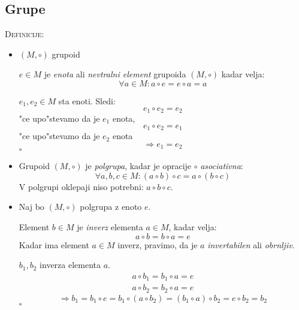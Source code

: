 \subsection{Grupe}

\textsc{Definicije:}
\begin{itemize}
	\item $(M, \circ)$ grupoid
	
	$e \in M$ je \emph{enota} ali \emph{nevtralni element} grupoida $(M, \circ)$ kadar velja:
	\begin{equation*}
	\forall a \in M: a \circ e = e \circ a = a
	\end{equation*}
	
	
	$e_1, e_2 \in M$ sta enoti. Sledi:
	\begin{equation*}
	e_1 \circ e_2 = e_2
	\end{equation*}
	"ce upo"stevamo da je $e_1$ enota,
	\begin{equation*}
	e_1 \circ e_2 = e_1
	\end{equation*}
	"ce upo"stevamo da je $e_2$ enota
	\begin{equation*}
	\Rightarrow e_1 = e_2
	\end{equation*}
	\hfill $\square$
	
	\item Grupoid $(M, \circ)$ je \emph{polgrupa}, kadar je opracije $\circ$ \emph{asociativna}:
	\begin{equation*}
	\forall a, b, c \in M: (a \circ b) \circ c = a \circ (b \circ c)
	\end{equation*}
	V polgrupi oklepaji niso potrebni: $a \circ b \circ c$.
	
	\item Naj bo $(M, \circ)$ polgrupa z enoto $e$.
	
	Element $b \in M$ je \emph{inverz} elementa $a \in M$, kadar velja:
	\begin{equation*}
	a \circ b = b \circ a = e
	\end{equation*}
	Kadar ima element $a \in M$ inverz, pravimo, da je $a$ \emph{invertabilen} ali \emph{obrnljiv}.
	
	
	$b_1, b_2$ inverza elementa $a$.
	\begin{align*}
	a \circ b_1 = b_1 \circ a = e\\
	a \circ b_2 = b_2 \circ a = e
	\end{align*}
	\begin{equation*}
	\Rightarrow b_1 = b_1 \circ e = b_1 \circ (a \circ b_2) = (b_1 \circ a) \circ b_2 = e \circ b_2 = b_2
	\end{equation*}
	\hfill $\square$
	

\end{itemize}
